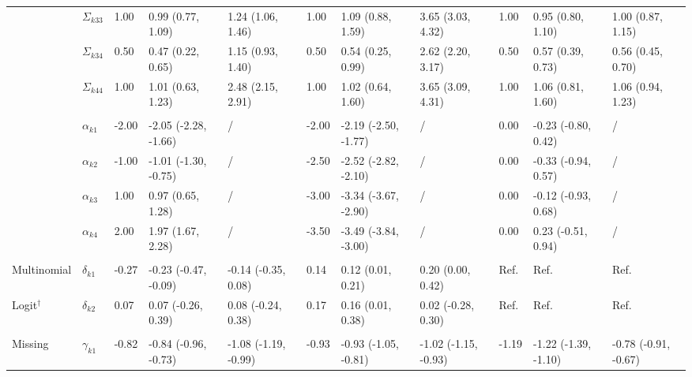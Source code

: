 \documentclass[useAMS,11pt]{article}
\newcommand{\1}{\mathbbm{1}}
\begin{document}
\begin{landscape}
\begin{table}[t]
\begin{center}
\begin{tabular}{lllllllllll}
\hspace{1em} & $\Sigma_{k33}$ & 1.00 & 0.99 (0.77, 1.09) & 1.24 (1.06, 1.46) & 1.00 & 1.09 (0.88, 1.59) & 3.65 (3.03, 4.32) & 1.00 & 0.95 (0.80, 1.10) & 1.00 (0.87, 1.15)\\
\hspace{1em} & $\Sigma_{k34}$ & 0.50 & 0.47 (0.22, 0.65) & 1.15 (0.93, 1.40) & 0.50 & 0.54 (0.25, 0.99) & 2.62 (2.20, 3.17) & 0.50 & 0.57 (0.39, 0.73) & 0.56 (0.45, 0.70)\\
\hspace{1em} & $\Sigma_{k44}$ & 1.00 & 1.01 (0.63, 1.23) & 2.48 (2.15, 2.91) & 1.00 & 1.02 (0.64, 1.60) & 3.65 (3.09, 4.31) & 1.00 & 1.06 (0.81, 1.60) & 1.06 (0.94, 1.23)\\
\addlinespace[0.3em]
\multicolumn{11}{l}{\textbf{ }}\\
\hspace{1em} & $\alpha_{k1}$ & -2.00 & -2.05 (-2.28, -1.66) & / & -2.00 & -2.19 (-2.50, -1.77) & / & 0.00 & -0.23 (-0.80, 0.42) & /\\
\hspace{1em} & $\alpha_{k2}$ & -1.00 & -1.01 (-1.30, -0.75) & / & -2.50 & -2.52 (-2.82, -2.10) & / & 0.00 & -0.33 (-0.94, 0.57)& /\\
\hspace{1em} & $\alpha_{k3}$ & 1.00 & 0.97 (0.65, 1.28) & / & -3.00 & -3.34 (-3.67, -2.90) & / & 0.00 & -0.12 (-0.93, 0.68) & /\\
\hspace{1em} & $\alpha_{k4}$ & 2.00 & 1.97 (1.67, 2.28) & / & -3.50 & -3.49 (-3.84, -3.00) & / & 0.00 & 0.23 (-0.51, 0.94) & /\\
\addlinespace[0.3em]
\multicolumn{11}{l}{\textbf{ }}\\
\hspace{1em}Multinomial & $\delta_{k1}$ & -0.27 & -0.23 (-0.47, -0.09) & -0.14 (-0.35, 0.08) & 0.14 & 0.12 (0.01, 0.21) & 0.20 (0.00, 0.42) & Ref. &  Ref. &  Ref.\\
\hspace{1em}Logit$^{\dagger}$ &$\delta_{k2}$ & 0.07 & 0.07 (-0.26, 0.39) & 0.08 (-0.24, 0.38) & 0.17 & 0.16 (0.01, 0.38) & 0.02 (-0.28, 0.30) & Ref. &  Ref. &  Ref.\\
\addlinespace[0.3em]
\multicolumn{11}{l}{\textbf{ }}\\
\hspace{1em}Missing & $\gamma_{k1}$ & -0.82 & -0.84 (-0.96, -0.73) & -1.08 (-1.19, -0.99) & -0.93 & -0.93 (-1.05, -0.81) & -1.02 (-1.15, -0.93) & -1.19 & -1.22 (-1.39, -1.10) & -0.78 (-0.91, -0.67)\\

\end{tabular}
\end{center}
\end{table}
\end{landscape}
\end{document}
